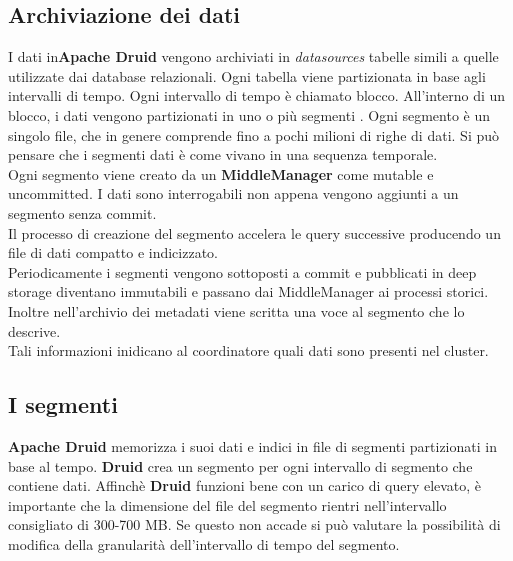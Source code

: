 \documentclass{article}
\begin{document}
\subsection{Archiviazione dei dati}
I dati in\textbf{Apache Druid} vengono archiviati in \textit{datasources} tabelle simili a quelle utilizzate dai database relazionali. Ogni tabella viene partizionata in base agli intervalli di tempo. Ogni intervallo di tempo è chiamato blocco. All'interno di un blocco, i dati vengono partizionati in uno o più segmenti . Ogni segmento è un singolo file, che in genere comprende fino a pochi milioni di righe di dati. Si può pensare che i segmenti dati è come vivano in una sequenza temporale.\\
Ogni segmento viene creato da un \textbf{MiddleManager} come mutable e uncommitted.  I dati sono interrogabili non appena vengono aggiunti a un segmento senza commit.\\
Il processo di creazione del segmento accelera le query successive producendo un file di dati compatto e indicizzato. \\
Periodicamente i segmenti vengono sottoposti a commit e pubblicati in deep storage diventano immutabili e passano dai MiddleManager ai processi storici. Inoltre nell'archivio dei metadati viene scritta una voce al segmento che lo descrive.\\
Tali informazioni inidicano al coordinatore quali dati sono presenti nel cluster.

\subsection{I segmenti}
\textbf{Apache Druid} memorizza i suoi dati e indici in file di segmenti partizionati in base al tempo.
\textbf{Druid} crea un segmento per ogni intervallo di segmento che contiene dati.
Affinchè \textbf{Druid} funzioni bene  con un carico di query elevato, è importante che la dimensione del file del segmento rientri nell'intervallo consigliato di 300-700 MB. Se questo non accade si può valutare la possibilità di modifica della granularità dell'intervallo di tempo del segmento.
\end{document}
